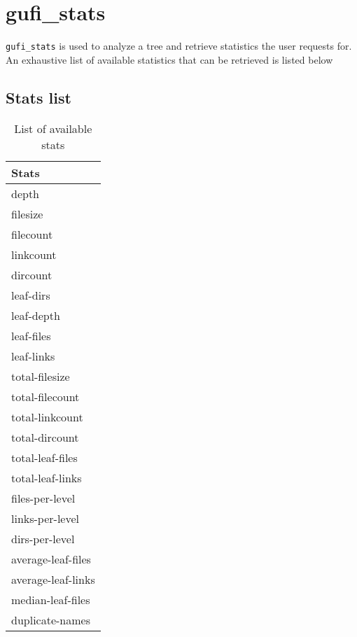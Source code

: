\section{gufi\_stats}
\texttt{gufi\_stats} is used to analyze a tree and retrieve statistics the user requests for. An exhaustive list of available statistics that can be retrieved is listed below

\subsection{Stats list}
\begin{table} [h]
\centering
\begin{tabular}{l}
Stats\\\hline
depth \\
filesize \\
filecount \\
linkcount \\
dircount \\
leaf-dirs \\
leaf-depth \\
leaf-files \\
leaf-links \\
total-filesize \\
total-filecount \\
total-linkcount \\
total-dircount \\
total-leaf-files \\
total-leaf-links \\
files-per-level \\ 
links-per-level \\
dirs-per-level \\
average-leaf-files \\
average-leaf-links \\ 
median-leaf-files \\
duplicate-names
\end{tabular}
\caption{\label{fig:stat_options}List of available stats}
\end{table}

